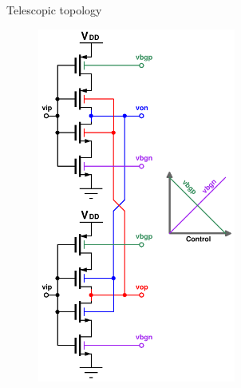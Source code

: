 \documentclass[t, screen, aspectratio=43]{beamer}
\begin{document}
\begin{frame}
\begin{block}{Telescopic topology}
\begin{minipage}{6cm}
\begin{figure}[htb!]
			        \includegraphics[width=0.58\textwidth, angle=0]{tele_delay_cell}
			\end{figure}
		\end{minipage}%

	\end{block}	
\end{frame}
\end{document}

